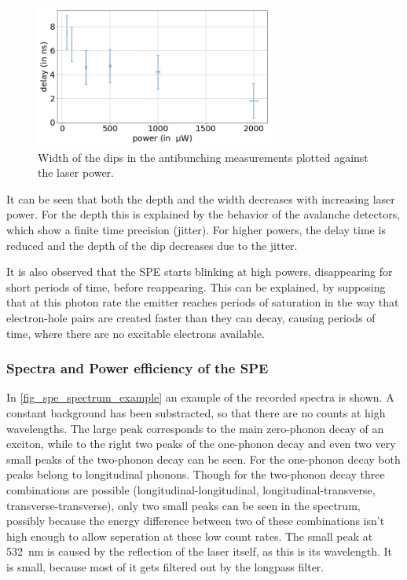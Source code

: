 \begin{figure}[H]
    \centering
    \includegraphics[width=0.7\textwidth]{img/output_t2/dip_width.png}
    \caption{Width of the dips in the antibunching measurements plotted against the laser power.}
    \label{fig_dip_width}
\end{figure}

It can be seen that both the depth and the width decreases with increasing laser power.
For the depth this is explained by the behavior of the avalanche detectors, which show a finite time precision (jitter).
For higher powers, the delay time is reduced and the depth of the dip decreases due to the jitter.

It is also observed that the SPE starts blinking at high powers, disappearing for short periods of time, before reappearing.
This can be explained, by supposing that at this photon rate the emitter reaches periods of saturation in the way that electron-hole pairs are created faster than they can decay, causing periods of time, where there are no excitable electrons available.

\subsubsection{Spectra and Power efficiency of the SPE}

In \cref{fig_spe_spectrum_example} an example of the recorded spectra is shown.
A constant background has been substracted, so that there are no counts at high wavelengths.
The large peak corresponds to the main zero-phonon decay of an exciton, while to the right two peaks of the one-phonon decay and even two very small peaks of the two-phonon decay can be seen.
For the one-phonon decay both peaks belong to longitudinal phonons.
Though for the two-phonon decay three combinations are possible (longitudinal-longitudinal, longitudinal-transverse, transverse-transverse), only two small peaks can be seen in the spectrum, possibly because the energy difference between two of these combinations isn't high enough to allow seperation at these low count rates.
The small peak at \SI{532}{nm} is caused by the reflection of the laser itself, as this is its wavelength.
It is small, because most of it gets filtered out by the longpass filter.

